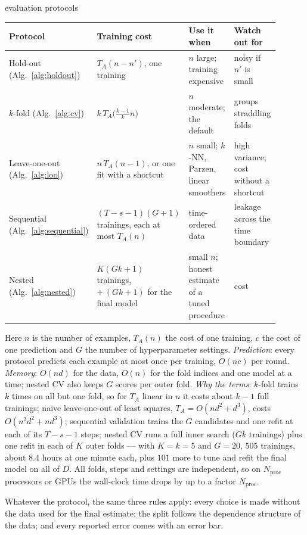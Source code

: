 \documentclass[11pt]{article}
\begin{document}
\begin{runtime}{evaluation protocols}
\begin{tabular}{@{}L{0.17\linewidth}L{0.21\linewidth}L{0.25\linewidth}L{0.27\linewidth}@{}}
\toprule
Protocol & Training cost & Use it when & Watch out for \\
\midrule
Hold-out (Alg.~\ref{alg:holdout}) & $T_A(n - n')$, one training & $n$ large; training expensive & noisy if $n'$ is small \\
$k$-fold (Alg.~\ref{alg:cv}) & $k\,T_A\big(\frac{k-1}{k}n\big)$ & $n$ moderate; the default & groups straddling folds \\
Leave-one-out (Alg.~\ref{alg:loo}) & $n\,T_A(n-1)$, or one fit with a shortcut & $n$ small; $k$-NN, Parzen, linear smoothers & high variance; cost without a shortcut \\
Sequential (Alg.~\ref{alg:sequential}) & $(T - s - 1)(G + 1)$ trainings, each at most $T_A(n)$ & time-ordered data & leakage across the time boundary \\
Nested (Alg.~\ref{alg:nested}) & $K(Gk+1)$ trainings, $+\,(Gk+1)$ for the final model & small $n$; honest estimate of a tuned procedure & cost \\
\bottomrule
\end{tabular}
\par\smallskip
Here $n$ is the number of examples, $T_A(n)$ the cost of one training, $c$ the cost of one prediction and $G$ the number
of hyperparameter settings. \emph{Prediction}: every protocol predicts each example at most once per training, $O(nc)$ per round. \emph{Memory}:
$O(nd)$ for the data, $O(n)$ for the fold indices and one model at a time; nested CV also keeps $G$ scores per outer
fold. \emph{Why the terms}: $k$-fold trains $k$ times on all but one
fold, so for $T_A$ linear in $n$ it costs about $k - 1$ full trainings; naive leave-one-out of least squares,
$T_A = O(nd^2 + d^3)$, costs $O(n^2d^2 + nd^3)$; sequential validation trains the $G$ candidates and one refit at each of its $T - s - 1$ steps; nested CV runs a full
inner search ($Gk$ trainings) plus one refit
in each of $K$ outer folds --- with $K = k = 5$ and $G = 20$, $505$ trainings, about $8.4$ hours at one minute each,
plus $101$ more to tune and refit the final model on all of $D$.
All folds, steps and settings are independent, so on $N_{\mathrm{proc}}$ processors or GPUs the wall-clock time drops by up to a
factor $N_{\mathrm{proc}}$.
\end{runtime}

Whatever the protocol, the same three rules apply: every choice is made without the data used for the final
estimate; the split follows the dependence structure of the data; and every reported error comes with an error bar.
\end{document}

